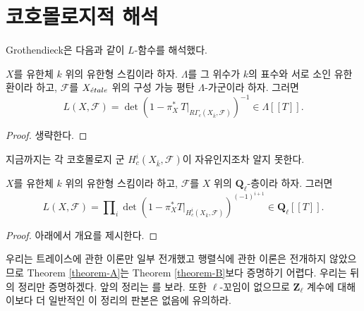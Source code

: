 \section{코호몰로지적 해석}
\label{section-L-cohomological}

\noindent
Grothendieck은 다음과 같이 $L$-함수를 해석했다.

\begin{theorem}[유한 계수]
\label{theorem-A}
$X$를 유한체 $k$ 위의 유한형 스킴이라 하자. $\Lambda$를 그 위수가
$k$의 표수와 서로 소인 유한환이라 하고, $\mathcal{F}$를
$X_{\acute{e}tale}$ 위의 구성 가능 평탄 $\Lambda$-가군이라 하자. 그러면
$$
L(X, \mathcal{F}) =
\det(1 - \pi_X^*\ T |_{R\Gamma_c(X_{\bar k}, \mathcal{F})})^{-1}
\in \Lambda[[T]].
$$
\end{theorem}

\begin{proof}
생략한다.
\end{proof}

\noindent
지금까지는 각 코호몰로지 군
$H^i_c(X_{\bar k}, \mathcal{F})$이 자유인지조차 알지 못한다.

\begin{theorem}[아딕 층]
\label{theorem-B}
$X$를 유한체 $k$ 위의 유한형 스킴이라 하고, $\mathcal{F}$를
$X$ 위의 $\mathbf{Q}_\ell$-층이라 하자. 그러면
$$
L(X, \mathcal{F}) =
\prod\nolimits_i
\det(1 - \pi_X^*T |_{H_c^i(X_{\bar k} , \mathcal{F})})^{(-1)^{i + 1}}
\in \mathbf{Q}_\ell[[T]].
$$
\end{theorem}

\begin{proof}
아래에서 개요를 제시한다.
\end{proof}

\begin{remark}
\label{remark-which-is-harder}
우리는 트레이스에 관한 이론만 일부 전개했고 행렬식에 관한 이론은
전개하지 않았으므로 Theorem \ref{theorem-A}는
Theorem \ref{theorem-B}보다 증명하기 어렵다. 우리는 뒤의 정리만
증명하겠다. 앞의 정리는 \cite{SGA4.5}를 보라. 또한
$\ell$-꼬임이 없으므로 $\mathbf{Z}_\ell$ 계수에 대해 이보다 더
일반적인 이 정리의 판본은 없음에 유의하라.
\end{remark}

